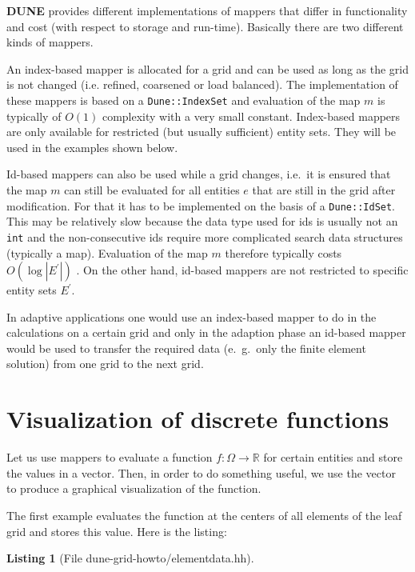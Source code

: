 \documentclass[11pt,a4paper,headinclude,footinclude,DIV16,headings=normal]{scrreprt}
\newcommand{\Dune}{{\sffamily\bfseries DUNE}\xspace}
\newtheorem{lst}{Listing}
\begin{document}
\Dune{} provides different implementations of mappers that differ in
functionality and cost (with respect to storage and
run-time). Basically there are two different kinds of mappers.


An index-based mapper is allocated for a grid and can be used as long
as the grid is not changed (i.e. refined, coarsened or load
balanced). The implementation of these mappers is based on a
\lstinline!Dune::IndexSet! and evaluation of the map $m$ is typically
of $O(1)$ complexity with a very small constant.
Index-based mappers are only available for restricted (but
usually sufficient) entity sets. They will be used in the examples
shown below.


Id-based mappers can also be used while a grid changes, i.e.~it is
ensured that the map $m$ can still be evaluated for all entities $e$
that are still in the grid after modification. For that it
has to be implemented on the basis of a \lstinline!Dune::IdSet!. This may be
relatively slow because the data type used for ids is usually not an
\lstinline!int! and the non-consecutive ids require more complicated search data
structures (typically a map). Evaluation of the map $m$ therefore
typically costs $O(\log |E^\prime|)$ . On the other hand, id-based
mappers are not restricted to specific entity sets $E^\prime$.

In adaptive applications one would use an index-based mapper to do in
the calculations on a certain grid and only in the adaption phase an
id-based mapper would be used to transfer the required data
(e.~g.~only the finite element solution) from one grid to the next grid.

\section{Visualization of discrete functions}

Let us use mappers to evaluate a function $f:\Omega\to\mathbb{R}$ for
certain entities and store the values in a vector. Then, in order to
do something useful, we use the vector to produce a graphical
visualization of the function.

The first example evaluates the function at the centers of all
elements of the leaf grid and stores this value. Here is the listing:

\begin{lst}[File dune-grid-howto/elementdata.hh] \mbox{}
\nopagebreak

\end{lst}
\end{document}
